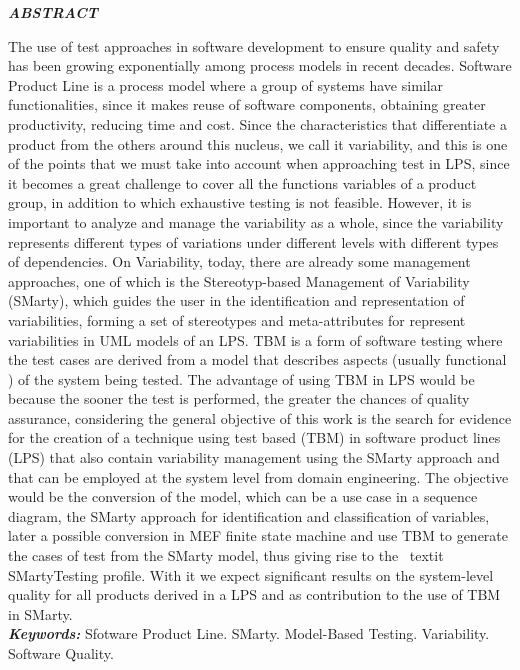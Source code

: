 \clearpage
\thispagestyle{empty}

\noindent{\large\bf\dadoTituloAbs}

\normalsize
\begin{center}	
	\vspace*{0.5cm}
	\textbf{\textit{ABSTRACT}}
\end{center}
The use of test approaches in software development to ensure quality and safety has been growing exponentially among process models in recent decades. Software Product Line is a process model where a group of systems have similar functionalities, since it makes reuse of software components, obtaining greater productivity, reducing time and cost. Since the characteristics that differentiate a product from the others around this nucleus, we call it variability, and this is one of the points that we must take into account when approaching test in LPS, since it becomes a great challenge to cover all the functions variables of a product group, in addition to which exhaustive testing is not feasible. However, it is important to analyze and manage the variability as a whole, since the variability represents different types of variations under different levels with different types of dependencies. On Variability, today, there are already some management approaches, one of which is the Stereotyp-based Management of Variability (SMarty), which guides the user in the identification and representation of variabilities, forming a set of stereotypes and meta-attributes for represent variabilities in UML models of an LPS. TBM is a form of software testing where the test cases are derived from a model that describes aspects (usually functional ) of the system being tested. The advantage of using TBM in LPS would be because the sooner the test is performed, the greater the chances of quality assurance, considering the general objective of this work is the search for evidence for the creation of a technique using test based (TBM) in software product lines (LPS) that also contain variability management using the SMarty approach and that can be employed at the system level from domain engineering. The objective would be the conversion of the model, which can be a use case in a sequence diagram, the SMarty approach for identification and classification of variables, later a possible conversion in MEF finite state machine and use TBM to generate the cases of test from the SMarty model, thus giving rise to the \ textit {SMartyTesting} profile. With it we expect significant results on the system-level quality for all products derived in a LPS and as contribution to the use of TBM in SMarty.
\\

\noindent \textbf{\textit{Keywords:}} Sfotware Product Line. SMarty. Model-Based Testing. Variability. Software Quality.

\pagebreak

 
